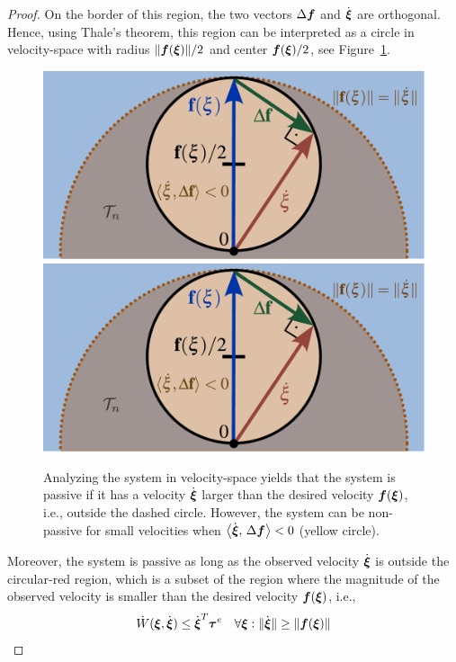 \begin{proof}
On the border of this region, the two vectors $\Delta \boldsymbol{f}$ and $\dot{{\boldsymbol{\xi}}}$ are orthogonal.
Hence, using Thale's theorem, this region can be interpreted as a circle in velocity-space with radius $\| \boldsymbol{f} ({\boldsymbol{\xi}}) \| / 2$ and center $\boldsymbol{f}({\boldsymbol{\xi}}) / 2$, see Figure~\ref{fig:passivity_analysis}.

\begin{figure}[bh]
	\centering
	\ifthesis
    \includegraphics[width=0.7\columnwidth]{figures/passivity_analysis}
	\else
    \includegraphics[width=.95\columnwidth]{figures/passivity_analysis.pdf}
	\fi
	\caption{Analyzing the system in velocity-space yields that the system is passive if it has a velocity $\dot{\boldsymbol{\xi}}$ larger than the desired velocity $\boldsymbol{f}(\boldsymbol{\xi})$, i.e., outside the dashed circle.
    However, the system can be non-passive for small velocities when  $\left\langle {\dot{\boldsymbol{\xi}}}, \, {\Delta \boldsymbol{f}} \right\rangle < 0$ (yellow circle).}
	\label{fig:passivity_analysis}
\end{figure}

Moreover, the system is passive as long as the observed velocity $\dot{{\boldsymbol{\xi}}}$ is outside the circular-red region, which is a subset of the region where the magnitude of the observed velocity is smaller than the desired velocity $\boldsymbol{f}({\boldsymbol{\xi}})$, i.e.,
\begin{equation}
	\dot W({\boldsymbol{\xi}}, \dot{{\boldsymbol{\xi}}}) \leq \dot{{\boldsymbol{\xi}}}^T \boldsymbol{\tau}^e
 \quad \forall {\boldsymbol{\xi}} : \| \dot{{\boldsymbol{\xi}}} \| \geq\| \boldsymbol{f}({\boldsymbol{\xi}}) \| 
\end{equation}

\end{proof}

